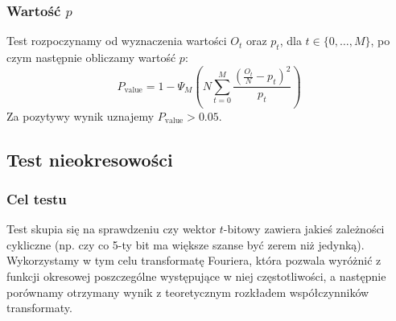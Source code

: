 \subsubsection{Wartość $p$}
Test rozpoczynamy od wyznaczenia wartości $O_t$ oraz $p_t$, dla $t \in \{ 0, \dots, M \}$, po czym następnie obliczamy wartość $p$:
\begin{equation}
    P_{\textrm{value}} =  1 - \Psi_M\left(N\sum_{t=0}^M{\frac{(\frac{O_t}{N}-p_t)^2}{p_t}}\right)
\end{equation}
Za pozytywy wynik uznajemy $P_{\textrm{value}} > 0.05$.
\subsection{Test nieokresowości}
\subsubsection{Cel testu}
Test skupia się na sprawdzeniu czy wektor $t$-bitowy zawiera jakieś zależności cykliczne (np. czy co 5-ty bit ma większe szanse być zerem niż jedynką). Wykorzystamy w tym celu transformatę Fouriera, która pozwala wyróżnić z funkcji okresowej poszczególne występujące w niej częstotliwości, a następnie porównamy otrzymany wynik z teoretycznym rozkładem współczynników transformaty.
